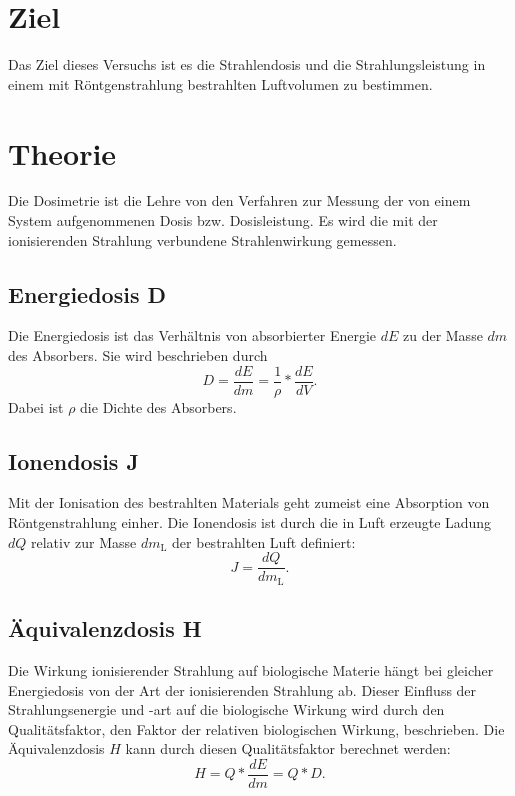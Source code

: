 \section{Ziel}
Das Ziel dieses Versuchs ist es die Strahlendosis und die
Strahlungsleistung in einem mit Röntgenstrahlung bestrahlten
Luftvolumen zu bestimmen.

\section{Theorie}
\label{sec:Theorie}

Die Dosimetrie ist die Lehre von den Verfahren zur Messung 
der von einem System aufgenommenen Dosis bzw. Dosisleistung.
Es wird die mit der ionisierenden Strahlung
verbundene Strahlenwirkung gemessen.

\subsection{Energiedosis D}
Die Energiedosis ist das Verhältnis von absorbierter
Energie $dE$ zu der Masse $dm$ des Absorbers.
Sie wird beschrieben durch
\begin{equation*}
    D = \frac{dE}{dm} = \frac{1}{\rho} * \frac{dE}{dV}.
    \label{eqn:Energiedosis}
\end{equation*}
Dabei ist $\rho$ die Dichte des Absorbers.

\subsection{Ionendosis J}
Mit der Ionisation des bestrahlten Materials geht zumeist
eine Absorption von Röntgenstrahlung einher. %
Die Ionendosis ist durch die in Luft erzeugte Ladung $dQ$
relativ zur Masse $dm_\text{L}$ der bestrahlten Luft definiert:
\begin{equation*}
    J = \frac{dQ}{dm_\text{L}}.
    \label{eqn:Ionendosis}
\end{equation*}

\subsection{Äquivalenzdosis H}
Die Wirkung ionisierender Strahlung auf biologische Materie
hängt bei gleicher Energiedosis von der Art der ionisierenden
Strahlung ab. Dieser Einfluss der Strahlungsenergie und -art
auf die biologische Wirkung wird durch den Qualitätsfaktor,
den Faktor der relativen biologischen Wirkung,
beschrieben.
Die Äquivalenzdosis $H$ kann durch diesen Qualitätsfaktor
berechnet werden:
\begin{equation*}
    H = Q * \frac{dE}{dm} = Q * D.
    \label{eqn:Aequivalenzdosis}
\end{equation*}

